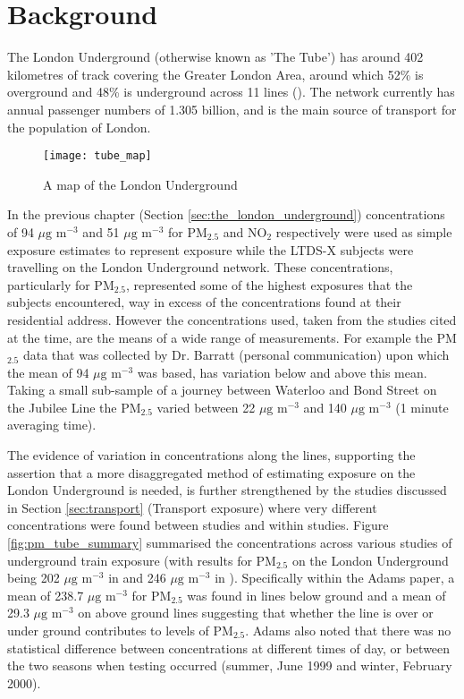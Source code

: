 \section{Background}
\label{sec:3background}

The London Underground (otherwise known as 'The Tube') has around 402 kilometres of track covering the Greater London Area, around which 52\% is overground and 48\% is underground across 11 lines  (\cite{TransportforLondon2014a}). The network currently has annual passenger numbers of 1.305 billion, and is the main source of transport for the population of London. 

\begin{figure}[H]
\centering
\texttt{[image: tube\_map]}
\caption{A map of the London Underground}
\label{fig:tube_map}
\end{figure}

In the previous chapter (Section \ref{sec:the_london_underground}) concentrations of 94 $\mu \text{g m}^{-3}$ and 51 $\mu \text{g m}^{-3}$ for PM$_{2.5}$ and NO$_{2}$ respectively were used as simple exposure estimates to represent exposure while the LTDS-X subjects were travelling on the London Underground network. These concentrations, particularly for PM$_{2.5}$, represented some of the highest exposures that the subjects encountered, way in excess of the concentrations found at their residential address. However the concentrations used, taken from the studies cited at the time, are the means of a wide range of measurements. For example the PM$_{2.5}$ data that was collected by Dr. Barratt (personal communication) upon which the mean of 94 $\mu \text{g m}^{-3}$ was based, has variation below and above this mean. Taking a small sub-sample of a journey between Waterloo and Bond Street on the Jubilee Line the PM$_{2.5}$ varied between 22 $\mu \text{g m}^{-3}$ and 140 $\mu \text{g m}^{-3}$ (1 minute averaging time).

The evidence of variation in concentrations along the lines, supporting the assertion that a more disaggregated method of estimating exposure on the London Underground is needed, is further strengthened by the studies discussed in Section \ref{sec:transport} (Transport exposure) where very different concentrations were found between studies and within studies. Figure \ref{fig:pm_tube_summary}  summarised the concentrations across various studies of underground train exposure (with results for PM$_{2.5}$ on the London Underground being 202 $\mu \text{g m}^{-3}$ in \cite{Adams2001} and 246 $\mu \text{g m}^{-3}$ in \cite{Pfeifer1999a}). Specifically within the Adams paper, a mean of 238.7 $\mu \text{g m}^{-3}$ for PM$_{2.5}$ was found in lines below ground and a mean of 29.3 $\mu \text{g m}^{-3}$ on above ground lines suggesting that whether the line is over or under ground contributes to levels of PM$_{2.5}$. Adams also noted that there was no statistical difference between concentrations at different times of day, or between the two seasons when testing occurred (summer, June 1999 and winter, February 2000).

